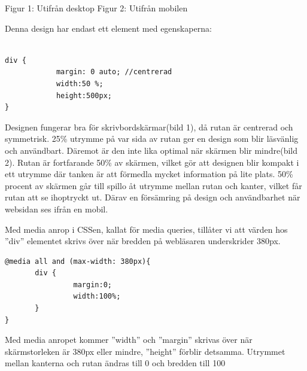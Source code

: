 \documentclass[11pt]{article}
\begin{document}
\hspace{1.5cm}Figur 1: Utifrån desktop \hspace{4.8cm} Figur 2: Utifrån mobilen

\newpage

Denna design har endast ett element med egenskaperna:

\vspace{0.5cm}
\begin{verbatim}

div {	
	        margin: 0 auto; //centrerad
	        width:50 %;
	        height:500px;
}

\end{verbatim}

Designen fungerar bra för skrivbordskärmar(bild 1), då rutan är centrerad och symmetrisk. 25\% utrymme på var sida av rutan ger en design som blir läsvänlig och användbart. Däremot är den inte lika optimal när skärmen blir mindre(bild 2). Rutan är fortfarande 50\% av skärmen, vilket gör att  designen blir kompakt i ett utrymme där tanken är att förmedla mycket information på lite plats. 50\% procent av skärmen går till spillo åt utrymme mellan rutan och kanter, vilket får rutan att se ihoptryckt ut. Därav en försämring på design och användbarhet när websidan ses ifrån en mobil.

Med media anrop i CSSen, kallat för media queries, tillåter vi att värden hos ”div” elementet skrivs över när bredden på webläsaren underskrider 380px.

\vspace{0.5cm}
\begin{verbatim}
@media all and (max-width: 380px){
       div {
                margin:0;
                width:100%;
       }
}
\end{verbatim}
\vspace{0.5cm}

Med media anropet kommer ”width” och ”margin” skrivas över när skärmstorleken är 380px eller mindre, ”height” förblir detsamma. Utrymmet mellan kanterna och rutan ändras till 0 och bredden till 100%
\end{document}
